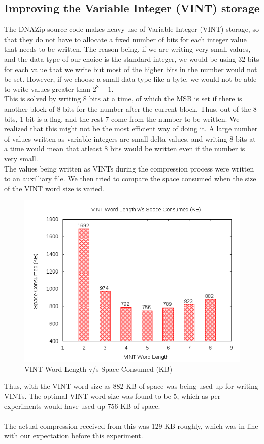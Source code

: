\documentclass{article}
\begin{document}
\subsection {Improving the Variable Integer (VINT) storage}
The DNAZip source code makes heavy use of Variable Integer (VINT) storage, so that they do not have to allocate a fixed
number of bits for each integer value that needs to be written. The reason being, if we are writing very small values, and the data type of our choice is the standard integer, we would be using 32 bits for each value that we write but most of the higher bits in the number would not be set. However, if we choose a small data type like a byte, we would not be able to write values greater than $2^8 - 1$. \\
This is solved by writing 8 bits at a time, of which the MSB is set if there is another block of 8 bits for the number after the current block. Thus, out of the 8 bits, 1 bit is a flag, and the rest 7 come from the number to be written. We realized that this might not be the most efficient way of doing it. A large number of values written as variable integers are small delta values, and writing 8 bits at a time would mean that atleast 8 bits would be written even if the number is very small. \\
The values being written as VINTs during the compression process were written to an auxilliary file. We then tried to compare the space consumed when the size of the VINT word size is varied. 

\begin{figure}[htp]
\centering
\includegraphics[scale=0.4]{images/VINT.png}
\caption{VINT Word Length v/s Space Consumed (KB)}\label{fig:fs}
\end{figure}
\clearpage
Thus, with the VINT word size as 882 KB of space was being used up for writing VINTs. The optimal VINT word size was found to be 5, which as per experiments would have used up 756 KB of space.\\
\\ 
The actual compression received from this was 129 KB roughly, which was in line with our expectation before this experiment.\\
\clearpage
\end{document}
